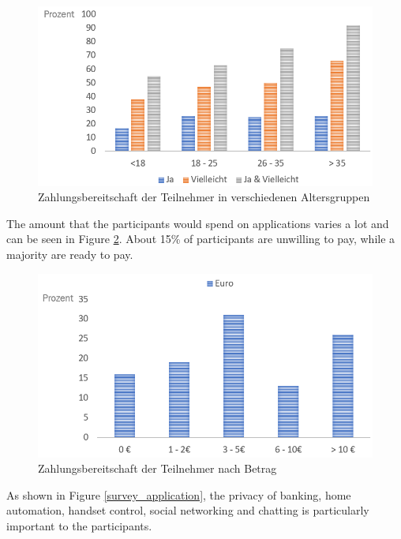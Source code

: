 \begin{figure}[h]
	\centering
	\includegraphics[width=0.9\linewidth]{Picture/umfrage_geld_gruppen}
	\caption[Zahlungsbereitschaft der Teilnehmer in verschiedenen Altersgruppen]{Zahlungsbereitschaft der Teilnehmer in verschiedenen Altersgruppen}
	\label{fig:umfrage_geld_gruppen}
\end{figure}

The amount that the participants would spend on applications varies a lot and can be seen in Figure \ref{fig:umfrage_betrag}. About 15\% of participants are unwilling to pay, while a majority are ready to pay.

\begin{figure}[h]
	\centering
	\includegraphics[width=0.9\linewidth]{Picture/umfrage_betrag}
	\caption[Zahlungsbereitschaft der Teilnehmer nach Betrag]{Zahlungsbereitschaft der Teilnehmer nach Betrag}
	\label{fig:umfrage_betrag}
\end{figure}

As shown in Figure \ref{survey_application}, the privacy of banking, home automation, handset control, social networking and chatting is particularly important to the participants.

